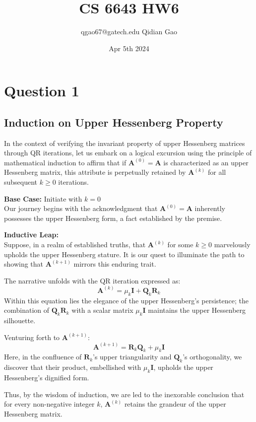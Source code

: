 \documentclass{article}
\title{CS 6643 HW6}
\author{qgao67@gatech.edu Qidian Gao}
\date{Apr 5th 2024}
\begin{document}
\maketitle
\section{Question 1}
\subsection{Induction on Upper Hessenberg Property}
In the context of verifying the invariant property of upper Hessenberg matrices through QR iterations, let us embark on a logical excursion using the principle of mathematical induction to affirm that if $\boldsymbol{A}^{(0)} = \boldsymbol{A}$ is characterized as an upper Hessenberg matrix, this attribute is perpetually retained by $\boldsymbol{A}^{(k)}$ for all subsequent $k \geq 0$ iterations.

\textbf{Base Case:} Initiate with $k=0$\\
Our journey begins with the acknowledgment that $\boldsymbol{A}^{(0)} = \boldsymbol{A}$ inherently possesses the upper Hessenberg form, a fact established by the premise.

\textbf{Inductive Leap:}\\
Suppose, in a realm of established truths, that $\boldsymbol{A}^{(k)}$ for some $k \geq 0$ marvelously upholds the upper Hessenberg stature. It is our quest to illuminate the path to showing that $\boldsymbol{A}^{(k+1)}$ mirrors this enduring trait.

The narrative unfolds with the QR iteration expressed as:
$$
\boldsymbol{A}^{(k)} = \mu_k \mathbf{I} + \boldsymbol{Q}_k \boldsymbol{R}_k
$$
Within this equation lies the elegance of the upper Hessenberg's persistence; the combination of $\boldsymbol{Q}_k \boldsymbol{R}_k$ with a scalar matrix $\mu_k \mathbf{I}$ maintains the upper Hessenberg silhouette.

Venturing forth to $\boldsymbol{A}^{(k+1)}$:
$$
\boldsymbol{A}^{(k+1)} = \boldsymbol{R}_k \boldsymbol{Q}_k + \mu_k \mathbf{I}
$$
Here, in the confluence of $\boldsymbol{R}_k$'s upper triangularity and $\boldsymbol{Q}_k$'s orthogonality, we discover that their product, embellished with $\mu_k \mathbf{I}$, upholds the upper Hessenberg's dignified form.

Thus, by the wisdom of induction, we are led to the inexorable conclusion that for every non-negative integer $k$, $\boldsymbol{A}^{(k)}$ retains the grandeur of the upper Hessenberg matrix.
\end{document}
